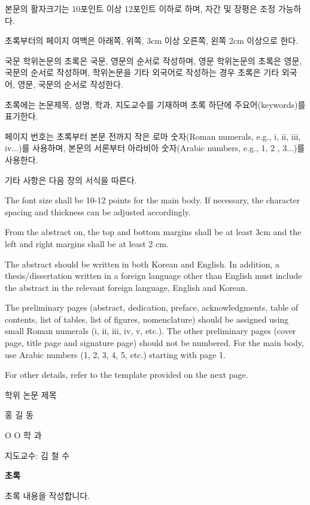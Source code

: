 \documentclass[11pt]{report}
\numberwithin{figure}{chapter}
\theoremstyle{plain}
\theoremstyle{definition}
\theoremstyle{corollary}
\theoremstyle{definition}
\theoremstyle{plain}
\theoremstyle{definition}
\theoremstyle{plain}
\begin{document}
\normalsize
본문의 활자크기는 10포인트 이상 12포인트 이하로 하며, 자간 및 장평은 조정 가능하다.

초록부터의 페이지 여백은 아래쪽, 위쪽, 3cm 이상 오른쪽, 왼쪽 2cm 이상으로 한다.

국문 학위논문의 초록은 국문, 영문의 순서로 작성하며, 영문 학위논문의 초록은 영문, 국문의 순서로 작성하며, 학위논문을 기타 외국어로 작성하는 경우 초록은 기타 외국어, 영문, 국문의 순서로 작성한다.

초록에는 논문제목, 성명, 학과, 지도교수를 기재하며 초록 하단에 주요어(keywords)를 표기한다.

페이지 번호는 초록부터 본문 전까지 작은 로마 숫자(Roman numerals, e.g., i, ii, iii, iv...)를 사용하며, 본문의 서론부터 아라비아 숫자(Arabic numbers, e.g., 1, 2 , 3...)를 사용한다.

기타 사항은 다음 장의 서식을 따른다. 

\bigskip

The font size shall be 10-12 points for the main body. If necessary, the character spacing and thickness can be adjusted accordingly.

From the abstract on, the top and bottom margins shall be at least 3cm and the left and right margins shall be at least 2 cm.

The abstract should be written in both Korean and English. In addition, a thesis/dissertation written in a foreign language other than English must include the abstract in the relevant foreign language, English and Korean. 

The preliminary pages (abstract, dedication, preface, acknowledgments, table of contents, list of tables, list of figures, nomenclature) should be assigned using small Roman numerals (i, ii, iii, iv, v, etc.).
The other preliminary pages (cover page, title page and signature page) should not be numbered.
For the main body, use Arabic numbers (1, 2, 3, 4, 5, etc.) starting with page 1.

For other details, refer to the template provided on the next page.

\newpage
\begin{center}
\Large 학위 논문 제목 

\par\vspace{20pt}

\normalsize 홍 길 동\par
O O 학 과\par
지도교수: 김 철 수

\par\vspace{20pt}

\Large \textbf{초록}
\end{center}
\normalsize
초록 내용을 작성합니다.
\par\vspace{100pt}
\end{document}
